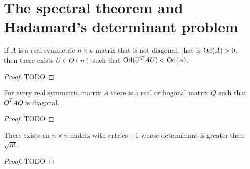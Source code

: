 \chapter{The spectral theorem and Hadamard's determinant problem}

\begin{lemma}
  \label{ch7.lemma}
  If $A$ is a real symmetric \(n \times n\) matrix that is not diagonal, that is
  \(\operatorname{Od}(A) > 0\), then there exists \(U \in O(n)\) such that \(\operatorname{Od}(U^TAU)<\operatorname{Od}(A)\).
\end{lemma}
\begin{proof}
  TODO
\end{proof}

\begin{theorem}
  \label{diagonalize_real_symmetric}
  \leanok
  For every real symmetric matrix \(A\) there is a real
  orthogonal matrix \(Q\) such that \(Q^{T}AQ\) is diagonal.
\end{theorem}
\begin{proof}
  TODO
\end{proof}


\begin{theorem}
  \label{exists_matrix}
  \leanok
  There exists an \(n \times n\) matrix with entries \(\pm 1\) whose
  determinant is greater than \(\sqrt{n!}\).
\end{theorem}
\begin{proof}
  TODO
\end{proof}

